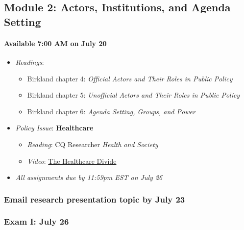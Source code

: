 \hypertarget{module-2-actors-institutions-and-agenda-setting}{%
\subsection{Module 2: Actors, Institutions, and Agenda
Setting}\label{module-2-actors-institutions-and-agenda-setting}}

\hypertarget{available-700-am-on-july-20}{%
\paragraph{Available 7:00 AM on July
20}\label{available-700-am-on-july-20}}

\begin{itemize}

\item
  \emph{Readings}:

  \begin{itemize}
  
  \item
    Birkland chapter 4: \emph{Official Actors and Their Roles in Public
    Policy}
  \item
    Birkland chapter 5: \emph{Unofficial Actors and Their Roles in
    Public Policy}
  \item
    Birkland chapter 6: \emph{Agenda Setting, Groups, and Power}
  \end{itemize}
\item
  \emph{Policy Issue}: \textbf{Healthcare}

  \begin{itemize}
  
  \item
    \emph{Reading}: CQ Researcher \emph{Health and Society}
  \item
    \emph{Video}:
    \href{https://www.pbs.org/video/the-healthcare-divide-rv6npd/}{The
    Healthcare Divide}
  \end{itemize}
\item
  \emph{All assignments due by 11:59pm EST on July 26}
\end{itemize}

\hypertarget{email-research-presentation-topic-by-july-23}{%
\subsubsection{Email research presentation topic by July
23}\label{email-research-presentation-topic-by-july-23}}

\hypertarget{exam-i-july-26}{%
\subsubsection{Exam I: July 26}\label{exam-i-july-26}}


